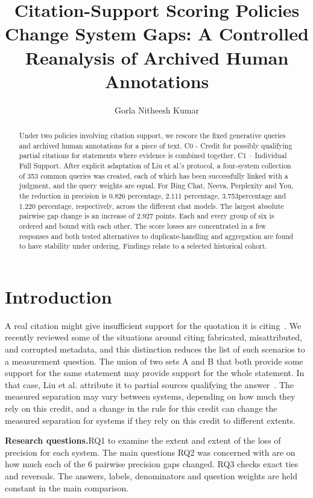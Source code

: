 \documentclass[acmsmall,screen,nonacm]{acmart}
\title[Citation-Support Scoring Policies]{Citation-Support Scoring Policies Change System Gaps: A Controlled Reanalysis of Archived Human Annotations}
\author{Gorla Nitheesh Kumar}
\affiliation{%
  \department{Department of Information Technology}
  \institution{Indian Institute of Information Technology Allahabad}
  \city{Prayagraj}
  \state{Uttar Pradesh}
  \country{India}
}
\begin{document}
\pagestyle{numberonly}
\setlength{\intextsep}{12pt}
 \raggedbottom
\begin{abstract}
Under two policies involving citation support, we rescore the fixed generative queries and archived human annotations for a piece of text. C0 - Credit for possibly qualifying partial citations for statements where evidence is combined together. C1 – Individual Full Support. After explicit adaptation of Liu et al.'s protocol, a four-system collection of 353 common queries was created, each of which has been successfully linked with a judgment, and the query weights are equal. For Bing Chat, Neeva, Perplexity and You, the reduction in precision is 0.826 percentage, 2.111 percentage, 3.753percentage and 1.220 percentage, respectively, across the different chat models. The largest absolute pairwise gap change is an increase of 2.927 points. Each and every group of six is ordered and bound with each other. The score losses are concentrated in a few responses and both tested alternatives to duplicate-handling and aggregation are found to have stability under ordering. Findings relate to a selected historical cohort.
\end{abstract}
\maketitle
\thispagestyle{numberonly}

\section{Introduction}
A real citation might give insufficient support for the quotation it is citing~\cite{liu2023,rashkin2023}. We recently reviewed some of the situations around citing fabricated, misattributed, and corrupted metadata, and this distinction reduces the list of such scenarios to a measurement question. The union of two sets A and B that both provide some support for the same statement may provide support for the whole statement. In that case, Liu et al. attribute it to partial sources qualifying the answer~\cite{liu2023}. The measured separation may vary between systems, depending on how much they rely on this credit, and a change in the rule for this credit can change the measured separation for systems if they rely on this credit to different extents.

\textbf{Research questions.}RQ1 to examine the extent and extent of the loss of precision for each system. The main questions RQ2 was concerned with are on how much each of the 6 pairwise precision gaps changed. RQ3 checks exact ties and reversals. The answers, labels, denominators and question weights are held constant in the main comparison.
\end{document}

